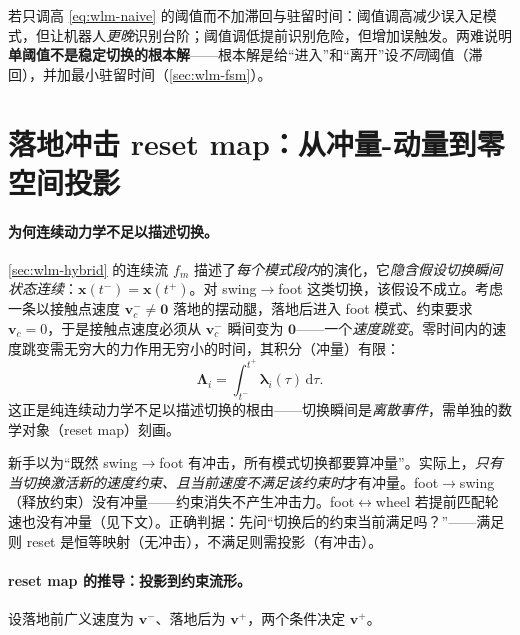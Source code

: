 \begin{pitfall}\label{pf:wlm-threshold}
若只调高 \cref{eq:wlm-naive} 的阈值而不加滞回与驻留时间：阈值调高减少误入足模式，但让机器人\emph{更晚}识别台阶；阈值调低提前识别危险，但增加误触发。两难说明\textbf{单阈值不是稳定切换的根本解}——根本解是给“进入”和“离开”设\emph{不同}阈值（滞回），并加最小驻留时间（\cref{sec:wlm-fsm}）。
\end{pitfall}

\section{落地冲击 reset map：从冲量-动量到零空间投影}
\label{sec:wlm-reset}

\paragraph{为何连续动力学不足以描述切换。}
\cref{sec:wlm-hybrid} 的连续流 $f_m$ 描述了\emph{每个模式段内}的演化，它\emph{隐含假设切换瞬间状态连续}：$\mathbf x(t^-)=\mathbf x(t^+)$。对 swing$\to$foot 这类切换，该假设不成立。考虑一条以接触点速度 $\mathbf v_c^-\ne\mathbf0$ 落地的摆动腿，落地后进入 foot 模式、约束要求 $\mathbf v_c=0$，于是接触点速度必须从 $\mathbf v_c^-$ 瞬间变为 $\mathbf0$——一个\emph{速度跳变}。零时间内的速度跳变需无穷大的力作用无穷小的时间，其积分（冲量）有限：
\begin{equation}
  \boldsymbol\Lambda_i=\int_{t^-}^{t^+}\boldsymbol\lambda_i(\tau)\,\mathrm d\tau.
  \label{eq:wlm-impulse}
\end{equation}
这正是纯连续动力学不足以描述切换的根由——切换瞬间是\emph{离散事件}，需单独的数学对象（reset map）刻画。

\begin{pitfall}\label{pf:wlm-not-all-impact}
新手以为“既然 swing$\to$foot 有冲击，所有模式切换都要算冲量”。实际上，\emph{只有当切换激活新的速度约束、且当前速度不满足该约束时}才有冲量。foot$\to$swing（释放约束）没有冲量——约束消失不产生冲击力。foot$\leftrightarrow$wheel 若提前匹配轮速也没有冲量（见下文）。正确判据：先问“切换后的约束当前满足吗？”——满足则 reset 是恒等映射（无冲击），不满足则需投影（有冲击）。
\end{pitfall}

\paragraph{reset map 的推导：投影到约束流形。}
设落地前广义速度为 $\mathbf v^-$、落地后为 $\mathbf v^+$，两个条件决定 $\mathbf v^+$。

